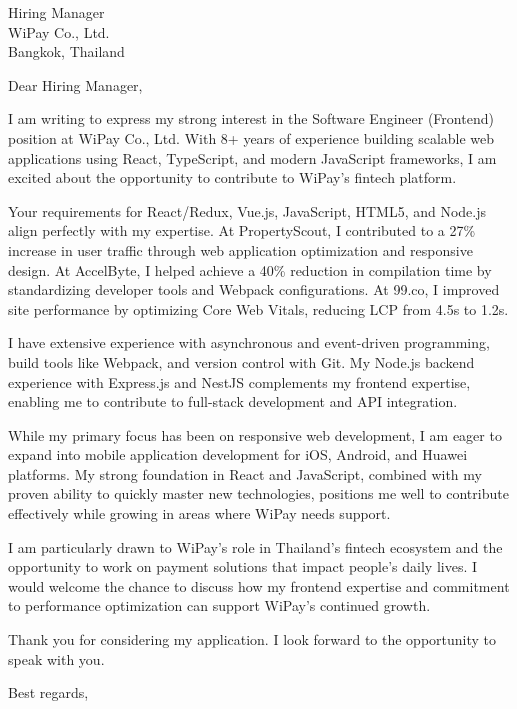 \documentclass[11pt,a4paper]{letter}
\begin{document}
\begin{letter}{
    Hiring Manager \\
    WiPay Co., Ltd. \\
    Bangkok, Thailand
}

\opening{Dear Hiring Manager,}

I am writing to express my strong interest in the Software Engineer (Frontend) position at WiPay Co., Ltd. With 8+ years of experience building scalable web applications using React, TypeScript, and modern JavaScript frameworks, I am excited about the opportunity to contribute to WiPay's fintech platform.

Your requirements for React/Redux, Vue.js, JavaScript, HTML5, and Node.js align perfectly with my expertise. At PropertyScout, I contributed to a 27\% increase in user traffic through web application optimization and responsive design. At AccelByte, I helped achieve a 40\% reduction in compilation time by standardizing developer tools and Webpack configurations. At 99.co, I improved site performance by optimizing Core Web Vitals, reducing LCP from 4.5s to 1.2s.

I have extensive experience with asynchronous and event-driven programming, build tools like Webpack, and version control with Git. My Node.js backend experience with Express.js and NestJS complements my frontend expertise, enabling me to contribute to full-stack development and API integration.

While my primary focus has been on responsive web development, I am eager to expand into mobile application development for iOS, Android, and Huawei platforms. My strong foundation in React and JavaScript, combined with my proven ability to quickly master new technologies, positions me well to contribute effectively while growing in areas where WiPay needs support.

I am particularly drawn to WiPay's role in Thailand's fintech ecosystem and the opportunity to work on payment solutions that impact people's daily lives. I would welcome the chance to discuss how my frontend expertise and commitment to performance optimization can support WiPay's continued growth.

Thank you for considering my application. I look forward to the opportunity to speak with you.

\closing{Best regards,}

\end{letter}
\end{document}
